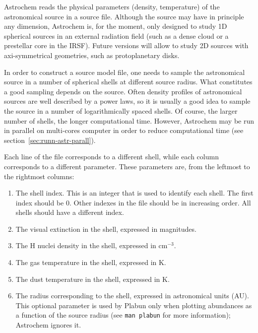 \documentclass[a4paper,12pt]{article}
\begin{document}
Astrochem reads the physical parameters (density, temperature) of the
astronomical source in a source file. Although the source may have in
principle any dimension, Astrochem is, for the moment, only designed
to study 1D spherical sources in an external radiation field (such as a
dense cloud or a prestellar core in the IRSF). Future versions will
allow to study 2D sources with axi-symmetrical geometries, such as
protoplanetary disks.

In order to construct a source model file, one needs to sample the
astronomical source in a number of spherical shells at different
source radius. What constitutes a good sampling depends on the
source. Often density profiles of astronomical sources are well
described by a power laws, so it is usually a good idea to sample the
source in a number of logarithmically spaced shells. Of course, the
larger number of shells, the longer computational time. However,
Astrochem may be run in parallel on multi-cores computer in order to
reduce computational time (see section~\ref{sec:runn-astr-parall}).

Each line of the file corresponds to a different shell, while each
column corresponds to a different parameter. These parameters are,
from the leftmost to the rightmost columns:

\begin{enumerate}

\item The shell index. This is an integer that is used to identify
  each shell. The first index should be 0. Other indexes in the file
  should be in increasing order. All shells should have a different
  index.

\item The visual extinction in the shell, expressed in magnitudes.

\item The H nuclei density in the shell, expressed in cm$^{-3}$.

\item The gas temperature in the shell, expressed in K.

\item The dust temperature in the shell, expressed in K.

\item The radius corresponding to the shell, expressed in astronomical
  units (AU). This optional parameter is used by Plabun only when
  plotting abundances as a function of the source radius (see
  \verb=man plabun= for more information); Astrochem ignores it.

\end{enumerate}
\end{document}
